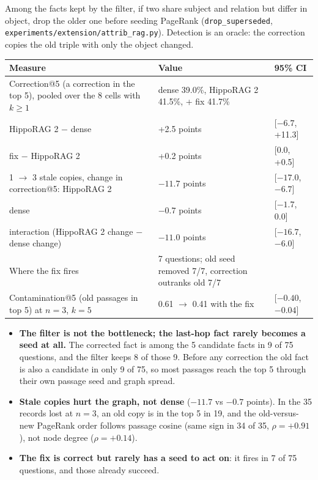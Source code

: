 \documentclass[10pt,a4paper]{article}
\newcommand{\sect}[1]{\par\vspace{3pt}{\large\bfseries #1}\par\vspace{0pt}}
\begin{document}
\sect{3. Proposed improvement 2: contradiction-aware seeding}
Among the facts kept by the filter, if two share subject and relation but differ in object, drop the older one before seeding PageRank
(\texttt{drop\_superseded}, \texttt{experiments/extension/attrib\_rag.py}). Detection is an oracle: the correction copies the old triple with only the object changed.

\sect{4. Results (N = 75)}
\begin{tabularx}{\textwidth}{@{}Xp{6.6cm}l@{}}
\toprule
Measure & Value & 95\% CI \\
\midrule
Correction@5 (a correction in the top 5), pooled over the 8 cells with $k \ge 1$ & dense 39.0\%, HippoRAG 2 41.5\%, + fix 41.7\% & \\ %
\quad HippoRAG 2 $-$ dense & +2.5 points & [$-6.7$, +11.3] \\ %
\quad fix $-$ HippoRAG 2 & +0.2 points & [0.0, +0.5] \\ %
1 $\rightarrow$ 3 stale copies, change in correction@5: HippoRAG 2 & $-11.7$ points & [$-17.0$, $-6.7$] \\ %
\quad dense & $-0.7$ points & [$-1.7$, 0.0] \\ %
\quad interaction (HippoRAG 2 change $-$ dense change) & $\mathbf{-11.0}$ points & [$-16.7$, $-6.0$] \\ %
Where the fix fires & 7 questions; old seed removed 7/7, correction outranks old 7/7 & \\ %
Contamination@5 (old passages in top 5) at $n=3$, $k=5$ & 0.61 $\rightarrow$ 0.41 with the fix & [$-0.40$, $-0.04$] \\ %
\bottomrule
\end{tabularx}

\sect{5. Findings}
\begin{itemize}
\item \textbf{The filter is not the bottleneck; the last-hop fact rarely becomes a seed at all.} The corrected fact is among the 5 candidate facts in 9 of 75 questions, and the filter keeps 8 of those 9. %
Before any correction the old fact is also a candidate in only 9 of 75, so most passages reach the top 5 through their own passage seed and graph spread. %
\item \textbf{Stale copies hurt the graph, not dense} ($-11.7$ vs $-0.7$ points). In the 35 records lost at $n=3$, an old copy is in the top 5 in 19, and the old-versus-new PageRank order follows passage cosine (same sign in 34 of 35, $\rho = +0.91$), not node degree ($\rho = +0.14$). %
\item \textbf{The fix is correct but rarely has a seed to act on}: it fires in 7 of 75 questions, and those already succeed. %
\end{itemize}
\end{document}

